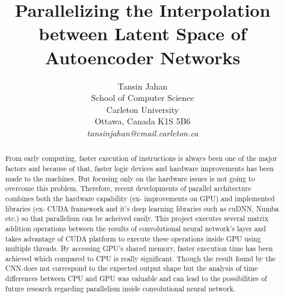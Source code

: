 \documentclass[11pt]{article}       %
\begin{document}


\title{Parallelizing the Interpolation between Latent Space of Autoencoder
Networks}


\author{
Tansin Jahan\\
School of Computer Science\\
Carleton University\\
Ottawa, Canada K1S 5B6\\
{\em tansinjahan@cmail.carleton.ca}
} %

\maketitle

\begin{abstract}
From early computing, faster execution of instructions is always been one of the major factors and because of that, faster logic devices and hardware improvements has been made to the machines. But focusing only on the hardware issues is not going to overcome this problem. Therefore, recent developments of parallel architecture combines both the hardware capability (ex- improvements on GPU) and implemented libraries (ex- CUDA framework and it's deep learning libraries such as cuDNN, Numba etc.) so that parallelism can be acheived easily. This project executes several matrix addition operations between the results of convolutional neural network's layer and takes advantage of CUDA platform to execute these operations inside GPU using multiple threads. By accessing GPU's shared memory, faster execution time has been achieved which compared to CPU is really significant. Though the result found by the CNN does not correspond to the expected output shape but the analysis of time differences between CPU and GPU was valuable and can lead to the possibilities of future research regarding parallelism inside convolutional neural network.       
\end{abstract}
\end{document}
